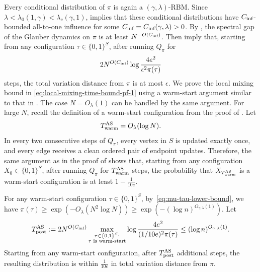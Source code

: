 \documentclass[11pt]{amsart}
\newcommand{\defeq}{:=}
\theoremstyle{definition}
\theoremstyle{remark}
\begin{document}
Every conditional distribution of $\pi$ is again a $(\gamma,\lambda)$-RBM. Since $\lambda < \lambda_0(1,\gamma) < \lambda_c(\gamma,1)$,  implies that these conditional distributions have $C_{\textnormal{inf}}$-bounded all-to-one influence for some $C_{\textnormal{inf}} = C_{\textnormal{inf}}(\gamma,\lambda) > 0$. By , the spectral gap of the Glauber dynamics on $\pi$ is at least $N^{-O(C_{\textnormal{inf}})}$. Then  imply that, starting from any configuration $\tau \in \{0,1\}^{S}$, after running $Q_\pi$ for
\[
2N^{O(C_{\textnormal{inf}})} \log \frac{4e^2}{\epsilon^2 \pi(\tau)}
\]
steps, the total variation distance from $\pi$ is at most $\epsilon$. We prove the local mixing bound in \eqref{eq:local-mixing-time-bound-pf-1} using a warm-start argument similar to that in . The case $N = O_{\lambda}(1)$ can be handled by the same argument. For large $N$, recall the definition of a warm-start configuration from the proof of . Let
\begin{align*}
T_{\textnormal{warm}}^{\textnormal{AS}} = O_\lambda(\log N).
\end{align*}
In every two consecutive steps of $Q_\pi$, every vertex in $S$ is updated exactly once, and every edge receives a clean ordered pair of endpoint updates. Therefore, the same argument as in the proof of  shows that, starting from any configuration $X_0 \in \{0,1\}^{S}$, after running $Q_\pi$ for $T_{\textnormal{warm}}^{\textnormal{AS}}$ steps, the probability that $X_{T_{\textnormal{warm}}^{\textnormal{AS}}}$ is a warm-start configuration is at least $1 - \frac{1}{10e}$.

For any warm-start configuration $\tau \in \{0,1\}^{S}$, by~\eqref{eq:mu-tau-lower-bound}, we have $\pi(\tau) \geq \exp(-O_\lambda(N^2 \log N)) \geq \exp(-(\log n)^{O_{\gamma,\lambda}(1)})$. Let
\begin{align*}
T_{\textnormal{post}}^{\textnormal{AS}} \defeq 2N^{O(C_{\textnormal{inf}})} \max_{\substack{\tau \in \{0,1\}^{S}:\\ \tau \textnormal{ is warm-start}}} \log \frac{4e^2}{(1/10e)^2 \pi(\tau)} \leq (\log n)^{O_{\gamma,\lambda}(1)}.
\end{align*}
Starting from any warm-start configuration, after $T_{\textnormal{post}}^{\textnormal{AS}}$ additional steps, the resulting distribution is within $\frac{1}{10e}$ in total variation distance from $\pi$.
\end{document}
